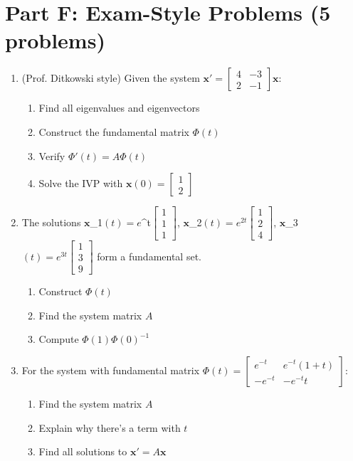 \documentclass[12pt]{article}
\begin{document}
\section*{Part F: Exam-Style Problems (5 problems)}

\begin{enumerate}[resume]
\item (Prof. Ditkowski style) Given the system $\mathbf{x}' = \begin{bmatrix} 4 & -3 \\ 2 & -1 \end{bmatrix}\mathbf{x}$:
\begin{enumerate}[label=(\alph*)]
\item Find all eigenvalues and eigenvectors
\item Construct the fundamental matrix $\Phi(t)$
\item Verify $\Phi'(t) = A\Phi(t)$
\item Solve the IVP with $\mathbf{x}(0) = \begin{bmatrix} 1 \\ 2 \end{bmatrix}$
\end{enumerate}

\item The solutions $\mathbf{x}$_{1}$(t) = e$^{t}$\begin{bmatrix} 1 \\ 1 \\ 1 \end{bmatrix}$, $\mathbf{x}$_{2}$(t) = e^{2t}\begin{bmatrix} 1 \\ 2 \\ 4 \end{bmatrix}$, $\mathbf{x}$_{3}$(t) = e^{3t}\begin{bmatrix} 1 \\ 3 \\ 9 \end{bmatrix}$ form a fundamental set.
\begin{enumerate}[label=(\alph*)]
\item Construct $\Phi(t)$
\item Find the system matrix $A$
\item Compute $\Phi(1)\Phi(0)^{-1}$
\end{enumerate}

\item For the system with fundamental matrix $\Phi(t) = \begin{bmatrix} e^{-t} & e^{-t}(1+t) \\ -e^{-t} & -e^{-t}t \end{bmatrix}$:
\begin{enumerate}[label=(\alph*)]
\item Find the system matrix $A$
\item Explain why there's a term with $t$
\item Find all solutions to $\mathbf{x}' = A\mathbf{x}$
\end{enumerate}


\end{enumerate}
\end{document}
